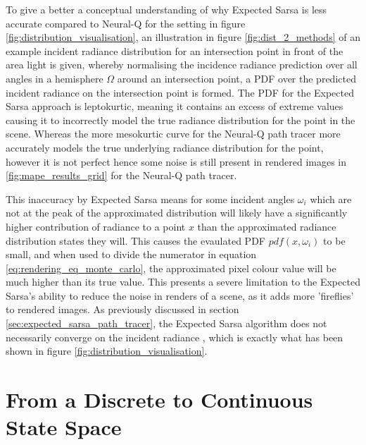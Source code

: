 \documentclass[../dissertation.tex]{subfiles}
\begin{document}
To give a better a conceptual understanding of why Expected Sarsa is less accurate compared to Neural-Q for the setting in figure \ref{fig:distribution_visualisation}, an illustration in figure \ref{fig:dist_2_methods} of an example incident radiance distribution for an intersection point in front of the area light is given, whereby normalising the incidence radiance prediction over all angles in a hemisphere $\Omega$ around an intersection point, a PDF over the predicted incident radiance on the intersection point is formed. The PDF for the Expected Sarsa approach is leptokurtic, meaning it contains an excess of extreme values causing it to incorrectly model the true radiance distribution for the point in the scene. Whereas the more mesokurtic curve for the Neural-Q path tracer more accurately models the true underlying radiance distribution for the point, however it is not perfect hence some noise is still present in rendered images in \ref{fig:mape_results_grid} for the Neural-Q path tracer.

 This inaccuracy by Expected Sarsa means for some incident angles $\omega_i$ which are not at the peak of the approximated distribution will likely have a significantly higher contribution of radiance to a point $x$ than the approximated radiance distribution states they will. This causes the evaulated PDF $pdf(x, \omega_i)$ to be small, and when used to divide the numerator in equation \ref{eq:rendering_eq_monte_carlo}, the approximated pixel colour value will be much higher than its true value. This presents a severe limitation to the Expected Sarsa's ability to reduce the noise in renders of a scene, as it adds more 'fireflies' to rendered images. As previously discussed in section \ref{sec:expected_sarsa_path_tracer}, the Expected Sarsa algorithm does not necessarily converge on the incident radiance \cite{dahm2017learning}, which is exactly what has been shown in figure \ref{fig:distribution_visualisation}.

\section{From a Discrete to Continuous State Space}
\end{document}
